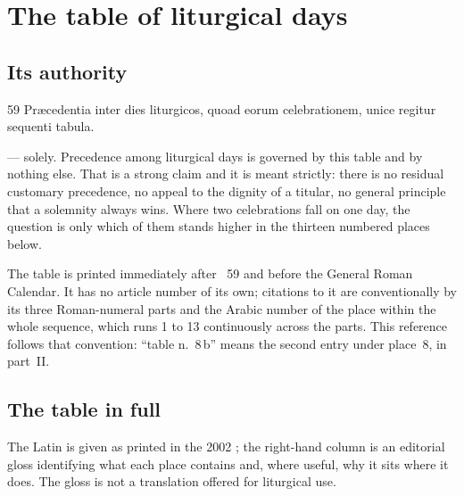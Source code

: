 \section{The table of liturgical days}
\label{sec:table}

\subsection{Its authority}

\begin{normtext}{ 59}
Præcedentia inter dies liturgicos, quoad eorum celebrationem, unice regitur sequenti tabula.
\end{normtext}

 --- solely. Precedence among liturgical days is governed by this table and by nothing
else. That is a strong claim and it is meant strictly: there is no residual customary precedence, no
appeal to the dignity of a titular, no general principle that a solemnity always wins. Where two
celebrations fall on one day, the question is only which of them stands higher in the thirteen
numbered places below.

The table is printed immediately after ~59 and before the General Roman Calendar. It has
no article number of its own; citations to it are conventionally by its three Roman-numeral parts
and the Arabic number of the place within the whole sequence, which runs 1 to 13 continuously across
the parts. This reference follows that convention: ``table n.~8\,b'' means the second entry under
place~8, in part~II.

\subsection{The table in full}

The Latin is given as printed in the 2002 ; the right-hand column is an
editorial gloss identifying what each place contains and, where useful, why it sits where it does.
The gloss is not a translation offered for liturgical use.

